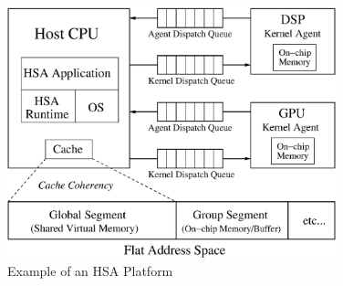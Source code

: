         \begin{figure}[!ht] 
            \centering
            \includegraphics[width=0.85\textwidth]{./figs/systemspec.eps}
            \caption{Example of an HSA Platform}
            \label{fig:systemspec}
        \end{figure}
